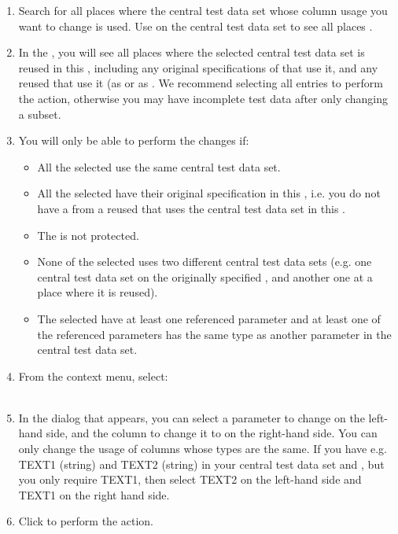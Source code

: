 \begin{enumerate}
\item Search for all places where the central test data set whose column usage you want to change is used. Use  on the central test data set to see all places . 
\item In the \gdsearchresultview{}, you will see all places where the selected central test data set is reused in this \gdproject{}, including any original specifications of \gdcases{} that use it, and any reused \gdcases{} that use it (as \gdcases{} or as \gdehandlers{}. We recommend selecting all entries to perform the action, otherwise you may have incomplete test data after only changing a subset. 
\item You will only be able to perform the changes if:
\begin{itemize}
\item All the selected \gdcases{} use the same central test data set.
\item All the selected \gdcases{} have their original specification in this \gdproject{}, i.e. you do not have a \gdcase{} from a reused \gdproject{} that uses the central test data set in this \gdproject{}.
\item The \gdproject{} is not protected.
\item None of the selected \gdcases{} uses two different central test data sets (e.g. one central test data set on the originally specified \gdcase{}, and another one at a place where it is reused).
\item The selected \gdcases{} have at least one referenced parameter and at least one of the referenced parameters has the same type as another parameter in the central test data set.
\end{itemize}
\item From the context menu, select:\\
\\
\item In the dialog that appears, you can select a parameter to change on the left-hand side, and the column to change it to on the right-hand side. You can only change the usage of columns whose types are the same. If you have e.g. TEXT1 (string) and TEXT2 (string)  in your central test data set and \gdcases{}, but you only require TEXT1, then select TEXT2 on the left-hand side and TEXT1 on the right hand side.
\item Click  to perform the action. 

\end{enumerate}
